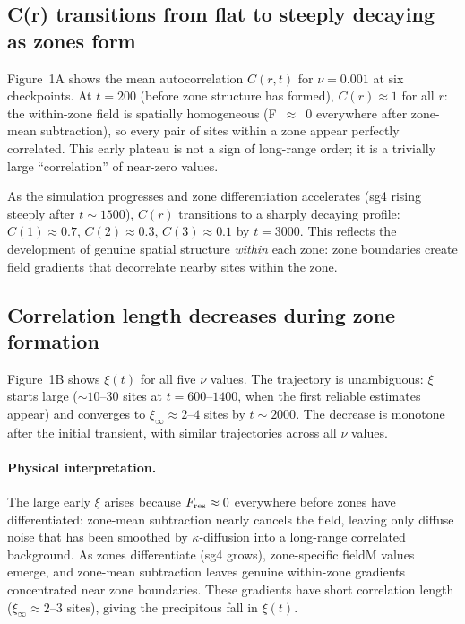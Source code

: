 \documentclass[11pt]{article}
\begin{document}
\subsection{C(r) transitions from flat to steeply decaying as zones form}

Figure~1A shows the mean autocorrelation $C(r,t)$ for $\nu=0.001$ at six checkpoints.
At $t=200$ (before zone structure has formed), $C(r) \approx 1$ for all $r$:
the within-zone field is spatially homogeneous (F~$\approx$~0 everywhere after zone-mean
subtraction), so every pair of sites within a zone appear perfectly correlated.
This early plateau is not a sign of long-range order; it is a trivially large
``correlation'' of near-zero values.

As the simulation progresses and zone differentiation accelerates (sg4 rising steeply
after $t \sim 1500$), $C(r)$ transitions to a sharply decaying profile: $C(1) \approx 0.7$,
$C(2) \approx 0.3$, $C(3) \approx 0.1$ by $t=3000$.
This reflects the development of genuine spatial structure \emph{within} each zone:
zone boundaries create field gradients that decorrelate nearby sites within the zone.

\subsection{Correlation length decreases during zone formation}

Figure~1B shows $\xi(t)$ for all five $\nu$ values.
The trajectory is unambiguous: $\xi$ starts large (${\sim}10$--$30$ sites at $t = 600$--$1400$,
when the first reliable estimates appear) and converges to $\xi_\infty \approx 2$--$4$ sites
by $t \sim 2000$.
The decrease is monotone after the initial transient, with similar trajectories across all
$\nu$ values.

\paragraph{Physical interpretation.}
The large early $\xi$ arises because $F_{\rm res} \approx 0$ everywhere before zones have
differentiated: zone-mean subtraction nearly cancels the field, leaving only diffuse noise
that has been smoothed by $\kappa$-diffusion into a long-range correlated background.
As zones differentiate (sg4 grows), zone-specific fieldM values emerge, and zone-mean
subtraction leaves genuine within-zone gradients concentrated near zone boundaries.
These gradients have short correlation length ($\xi_\infty \approx 2$--$3$ sites),
giving the precipitous fall in $\xi(t)$.
\end{document}
